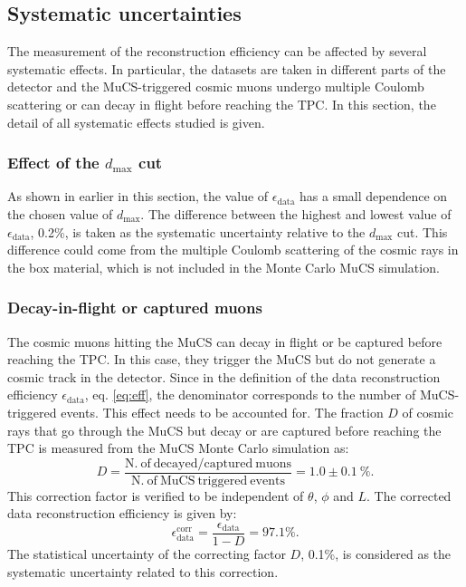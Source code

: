 \documentclass[a4paper,11pt]{article}
\begin{document}
\subsection{Systematic uncertainties}\label{sec:sys}
The measurement of the reconstruction efficiency can be affected by several systematic effects. In particular, the datasets are taken in different parts of the detector and the MuCS-triggered cosmic muons undergo multiple Coulomb scattering or can decay in flight before reaching the TPC. In this section, the detail of all systematic effects studied is given.

\subsubsection{Effect of the $d_{\mathrm{max}}$ cut}

As shown in earlier in this section, the value of $\epsilon_{\mathrm{data}}$ has a small dependence on the chosen value of $d_{\mathrm{max}}$. The difference between the highest and lowest value of $\epsilon_{\mathrm{data}}$, 0.2\%, is taken as the systematic uncertainty relative to the $d_{\mathrm{max}}$ cut. This difference could come from the multiple Coulomb scattering of the cosmic rays in the box material, which is not included in the Monte Carlo MuCS simulation.


\subsubsection{Decay-in-flight or captured muons}\label{sec:dif}
The cosmic muons hitting the MuCS can decay in flight or be captured before reaching the TPC. In this case, they trigger the MuCS but do not generate a cosmic track in the detector. Since in the definition of the data reconstruction efficiency $\epsilon_{\mathrm{data}}$, eq. \eqref{eq:eff}, the denominator corresponds to the number of MuCS-triggered events. This effect needs to be accounted for. The fraction $D$ of cosmic rays that go through the MuCS but decay or are captured before reaching the TPC is measured from the MuCS Monte Carlo simulation as:
\begin{equation}
D = \frac{\mathrm{N.~of~decayed/captured~muons}}{\mathrm{N.~of~MuCS~triggered~events}} = 1.0 \pm 0.1~\%.
\end{equation}
This correction factor is verified to be independent of $\theta$, $\phi$ and $L$. The corrected data reconstruction efficiency is given by:
\begin{equation}
\epsilon_{\mathrm{data}}^{\mathrm{corr}} =  \frac{\epsilon_{\mathrm{data}}}{1-D} = 97.1\%.
\end{equation}
The statistical uncertainty of the correcting factor $D$, 0.1\%, is considered as the systematic uncertainty related to this correction.
\end{document}

